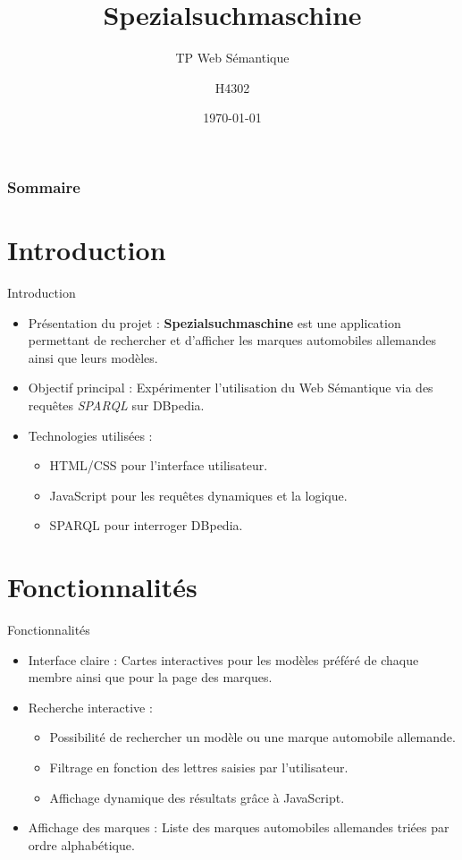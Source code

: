 \documentclass[10pt]{beamer}
\title[Spezialsuchmaschine]{Spezialsuchmaschine}
\subtitle{TP Web Sémantique}
\author[H4302]{H4302}
\institute[]{ INSA Lyon

Département Informatique}
\date[\today]
{\today}
\begin{document}
\frame{\titlepage}

\begin{frame}
\frametitle{Sommaire}
\tableofcontents
\end{frame}

\section{Introduction}
\begin{frame}{Introduction}
\begin{itemize}
    \item Présentation du projet : \textbf{Spezialsuchmaschine} est une application permettant de rechercher et d’afficher les marques automobiles allemandes ainsi que leurs modèles.  
    \item Objectif principal : Expérimenter l'utilisation du Web Sémantique via des requêtes \textit{SPARQL} sur DBpedia.
    \item Technologies utilisées :  
        \begin{itemize}
            \item HTML/CSS pour l'interface utilisateur.  
            \item JavaScript pour les requêtes dynamiques et la logique.  
            \item SPARQL pour interroger DBpedia.  
        \end{itemize}
\end{itemize}
\end{frame}

\section{Fonctionnalités}
\begin{frame}{Fonctionnalités}
\begin{itemize}
    \item Interface claire : Cartes interactives pour les modèles préféré de chaque membre ainsi que pour la page des marques.
    \item Recherche interactive :
        \begin{itemize}
            \item Possibilité de rechercher un modèle ou une marque automobile allemande.
            \item Filtrage en fonction des lettres saisies par l'utilisateur.  
            \item Affichage dynamique des résultats grâce à JavaScript.  
        \end{itemize}
    \item Affichage des marques : Liste des marques automobiles allemandes triées par ordre alphabétique.  
\end{itemize}
\end{frame}
\end{document}
